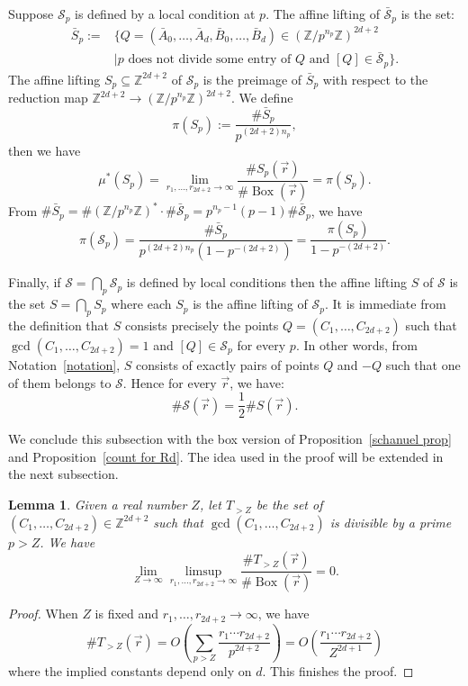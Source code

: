 \documentclass[12pt]{amsart}
\newtheorem{lemma}[theorem]{Lemma}
\newcommand{\Z}{\mathbb{Z}}
\newcommand{\cS}{\mathcal{S}}
\newcommand{\op}[1]{\operatorname{#1}}
\numberwithin{equation}{section}
\begin{document}
Suppose $\mathcal{S}_p$ is defined by a local condition at $p$. The affine lifting of $\bar{\mathcal{S}}_p$ is the set:
\[\begin{split}\bar{S}_p:=& \{Q=(\bar{A}_0, \dots, \bar{A}_d, \bar{B}_0, \dots, \bar{B}_d)\in (\Z/p^{n_p}\Z)^{2d+2} \\ 
 &  \mid p\text{ does not divide some entry of }Q \text{ and }[Q]\in \bar{\mathcal{S}}_p\}.\end{split}\]
The affine lifting $S_p\subseteq \Z^{2d+2}$ of $\mathcal{S}_p$ is the preimage of $\bar{S}_p$ with respect to the reduction map $\Z^{2d+2}\rightarrow (\Z/p^{n_p}\Z)^{2d+2}$. We define
\begin{equation}\label{eq:piSp definition}
\pi(S_p):=\frac{\# \bar{S}_p}{p^{(2d+2)n_p}},
\end{equation}
then we have
\begin{equation}\label{S_p eqn}
\mu^*(S_p)=\lim_{r_1,\dots,r_{2d+2}\rightarrow \infty}\frac{\# S_p(\vec{r})}{\#\op{Box}(\vec{r})}=\pi(S_p).
\end{equation}
From $\# \bar{S}_p=\#(\Z/p^{n_p}\Z)^*\cdot\# \bar{\mathcal{S}}_p= p^{n_p-1}(p-1)\#\bar{\mathcal{S}}_p$, we have
 \begin{equation}\label{eq:pi vs pi}\pi(\mathcal{S}_p)=\frac{\#\bar{S}_p}{p^{(2d+2)n_p}\left(1-p^{-(2d+2)}\right)}=\frac{\pi(S_p)}{1-p^{-(2d+2)}}.\end{equation}

Finally, if $\mathcal{S}=\bigcap_p \cS_p$ is defined by local conditions then the 
affine lifting $S$ of $\mathcal{S}$ is the set
$S=\bigcap_p S_p$ where each $S_p$ is the affine lifting of
$\mathcal{S}_p$. It is immediate from the definition that $S$ consists precisely the points $Q=(C_1,\ldots,C_{2d+2})$ such that
$\gcd(C_1,\ldots,C_{2d+2})=1$ and $[Q]\in \mathcal{S}_p$ for every $p$. 
In other words, from Notation~\ref{notation}, $S$ consists 
of exactly pairs of points $Q$ and $-Q$ such that one of them belongs to $\mathcal{S}$. Hence for every $\vec{r}$, we have:
\begin{equation}\label{eq:S and calS}
    \# \mathcal{S}(\vec{r})=\frac{1}{2} \# S(\vec{r}). 
\end{equation}

We conclude this subsection with the box version of Proposition~\ref{schanuel prop} and Proposition~\ref{count for Rd}. The idea used in the proof will be extended in the next subsection.

\begin{lemma}\label{lem:T_>Z}
    Given a real number $Z$, let $T_{>Z}$ be the set of $(C_1,\ldots,C_{2d+2})\in\Z^{2d+2}$ such that $\gcd(C_1,\ldots,C_{2d+2})$ is divisible by a prime $p>Z$. We have
    $$\lim_{Z\rightarrow\infty}\limsup_{r_1,\ldots,r_{2d+2}\rightarrow\infty}\frac{\# T_{>Z}(\vec{r})}{\# \op{Box}(\vec{r})}=0.$$
\end{lemma}
\begin{proof}
    When $Z$ is fixed and $r_1,\ldots,r_{2d+2}\rightarrow\infty$, we have
    $$\# T_{>Z}(\vec{r})=O\left(\sum_{p>Z}\frac{r_1\cdots r_{2d+2}}{p^{2d+2}}\right)=O\left(\frac{r_1\cdots r_{2d+2}}{Z^{2d+1}}\right)$$
    where the implied constants depend only on $d$. This finishes the proof.
\end{proof}
\end{document}
